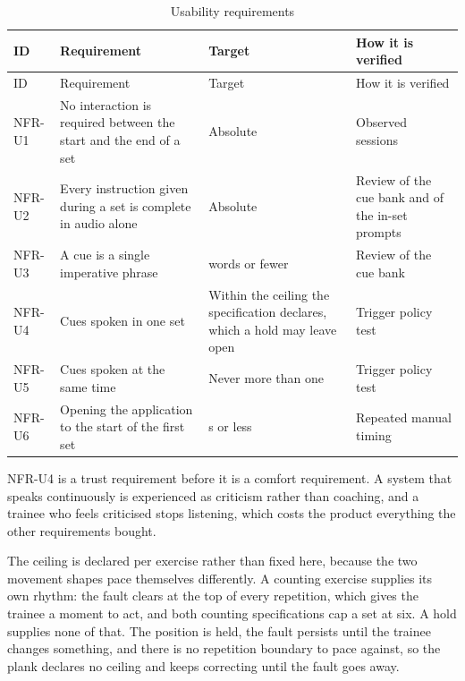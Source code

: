 {\footnotesize
\setlength{\LTpre}{6pt}\setlength{\LTpost}{8pt}
\begin{longtable}{>{\raggedright\arraybackslash}p{}>{\raggedright\arraybackslash}p{}>{\raggedright\arraybackslash}p{}>{\raggedright\arraybackslash}p{}}
\caption{Usability requirements}\\
\toprule
ID & Requirement & Target & How it is verified \\
\midrule
\endfirsthead
\toprule
ID & Requirement & Target & How it is verified \\
\midrule
\endhead
\bottomrule
\endfoot
\bottomrule
\endlastfoot
NFR-U1 & No interaction is required between the start and the end of a set & Absolute & Observed sessions \\
NFR-U2 & Every instruction given during a set is complete in audio alone & Absolute & Review of the cue bank and of the in-set prompts \\
NFR-U3 & A cue is a single imperative phrase & 5 words or fewer & Review of the cue bank \\
NFR-U4 & Cues spoken in one set & Within the ceiling the specification declares, which a hold may leave open & Trigger policy test \\
NFR-U5 & Cues spoken at the same time & Never more than one & Trigger policy test \\
NFR-U6 & Opening the application to the start of the first set & 60 s or less & Repeated manual timing \\
\end{longtable}
}

NFR-U4 is a trust requirement before it is a comfort requirement. A system that speaks continuously is experienced as criticism rather than coaching, and a trainee who feels criticised stops listening, which costs the product everything the other requirements bought.

The ceiling is declared per exercise rather than fixed here, because the two movement shapes pace themselves differently. A counting exercise supplies its own rhythm: the fault clears at the top of every repetition, which gives the trainee a moment to act, and both counting specifications cap a set at six. A hold supplies none of that. The position is held, the fault persists until the trainee changes something, and there is no repetition boundary to pace against, so the plank declares no ceiling and keeps correcting until the fault goes away.

